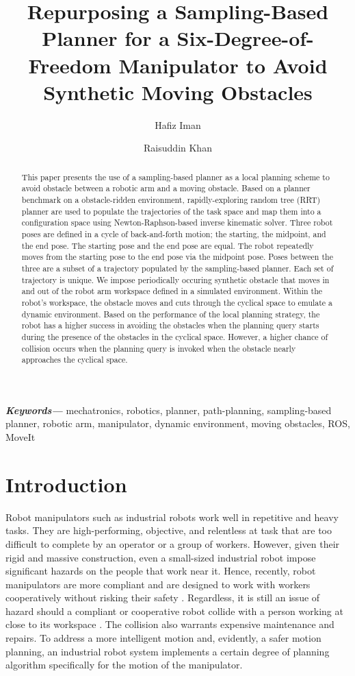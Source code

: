 \documentclass[a4paper, 10pt]{article}
\title{Repurposing a Sampling-Based Planner for a Six-Degree-of-Freedom Manipulator to Avoid Synthetic Moving Obstacles}
\author[1]{Hafiz Iman}
\author[1]{Raisuddin Khan}
\affil[1]{Department of Mechatronics Engineering, Kulliyah of Engineering, International Islamic University Malaysia}
\date{} %
\numberwithin{equation}{section} %
\providecommand{\keywords}[1]{\textbf{\textit{Keywords---}} #1}
\begin{document}
{\let\newpage\relax\maketitle}
\begin{abstract}
  This paper presents the use of a sampling-based planner 
  as a local planning scheme
  to avoid obstacle between a robotic arm and a moving obstacle.
  Based on a planner benchmark on a obstacle-ridden environment,
  rapidly-exploring random tree (RRT) planner are used to 
  populate the trajectories of the
  task space and map them into a configuration space using
  Newton-Raphson-based inverse kinematic solver.
  Three robot poses are defined in a cycle of back-and-forth motion; 
  the starting, the midpoint, 
  and the end pose. The starting pose and the end pose are equal.
  The robot repeatedly moves from the starting pose to the end pose via the 
  midpoint pose. Poses between the three are a subset of a trajectory populated 
  by the sampling-based planner. Each set of trajectory is unique. 
  We impose
  periodically occuring synthetic obstacle that moves in and out of 
  the robot arm workspace defined in a simulated environment. 
  Within the robot's workspace, 
  the obstacle moves and cuts through the cyclical space to emulate a 
  dynamic environment. Based on the performance of the local
  planning strategy, the robot has a higher success in
  avoiding the obstacles when the planning query starts during the presence of 
  the obstacles in the cyclical space. However, a higher chance of collision
  occurs when the planning query is invoked when the obstacle nearly 
  approaches the cyclical space.
\end{abstract}

\keywords{mechatronics, robotics, planner, path-planning, sampling-based planner, robotic arm, manipulator, dynamic environment, moving obstacles, ROS, MoveIt}
  


\section{Introduction}

Robot manipulators such as industrial robots 
work well in repetitive and heavy tasks. 
They are high-performing, objective, and relentless at
task that are too difficult to complete by an operator or
a group of workers. However, given their rigid and massive construction, even
a small-sized industrial robot impose significant hazards on the people that work near it. 
Hence, recently, robot manipulators are more
compliant and are designed to work with workers cooperatively without risking 
their safety \parencite{Hagele2016}. 
Regardless, it is still an issue of hazard should a compliant or cooperative
robot collide with a person working at close to 
its workspace \parencite{Matthias2011}. 
The collision also warrants expensive maintenance and repairs. To address a more
intelligent motion and, evidently, a safer motion planning, 
an industrial robot system implements a certain degree
of planning algorithm specifically for the motion of the manipulator.
\end{document}
